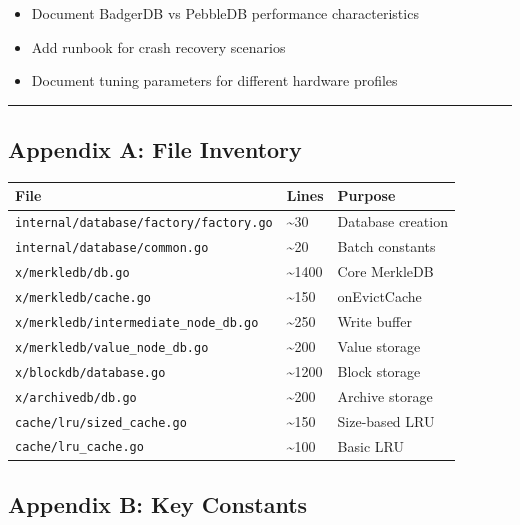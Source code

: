 \documentclass[
]{article}
\newcounter{none} %
\providecommand{\tightlist}{%
  \setlength{\itemsep}{0pt}\setlength{\parskip}{0pt}}
\begin{document}
\begin{itemize}
\tightlist
\item[$\square$]
  Document BadgerDB vs PebbleDB performance characteristics
\item[$\square$]
  Add runbook for crash recovery scenarios
\item[$\square$]
  Document tuning parameters for different hardware profiles
\end{itemize}

\begin{center}\rule{0.5\linewidth}{0.5pt}\end{center}

\subsection{Appendix A: File Inventory}\label{appendix-a-file-inventory}

{\def\LTcaptype{none} %
\begin{longtable}[]{@{}lll@{}}
\toprule\noalign{}
File & Lines & Purpose \\
\midrule\noalign{}
\endhead
\bottomrule\noalign{}
\endlastfoot
\texttt{internal/database/factory/factory.go} & \textasciitilde30 &
Database creation \\
\texttt{internal/database/common.go} & \textasciitilde20 & Batch
constants \\
\texttt{x/merkledb/db.go} & \textasciitilde1400 & Core MerkleDB \\
\texttt{x/merkledb/cache.go} & \textasciitilde150 & onEvictCache \\
\texttt{x/merkledb/intermediate\_node\_db.go} & \textasciitilde250 &
Write buffer \\
\texttt{x/merkledb/value\_node\_db.go} & \textasciitilde200 & Value
storage \\
\texttt{x/blockdb/database.go} & \textasciitilde1200 & Block storage \\
\texttt{x/archivedb/db.go} & \textasciitilde200 & Archive storage \\
\texttt{cache/lru/sized\_cache.go} & \textasciitilde150 & Size-based
LRU \\
\texttt{cache/lru\_cache.go} & \textasciitilde100 & Basic LRU \\
\end{longtable}
}

\subsection{Appendix B: Key Constants}\label{appendix-b-key-constants}
\end{document}
